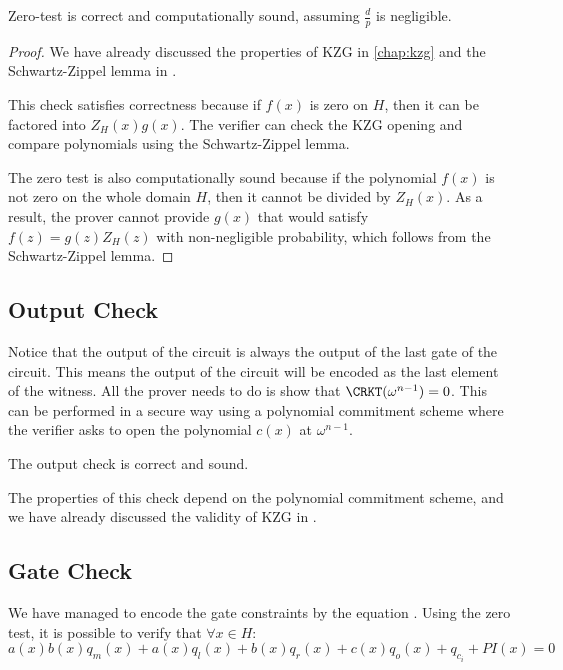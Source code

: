 \begin{theorem}
    Zero-test is correct and computationally sound, assuming $\frac{d}{p}$ is negligible.
\end{theorem}

\label{is this sufficient?}
\begin{proof}
    We have already discussed the properties of KZG in \cref{chap:kzg} and the Schwartz-Zippel lemma in . 

    This check satisfies correctness because if $f(x)$ is zero on $H$, then it can be factored into $Z_H(x)g(x)$. The verifier can check the KZG opening and compare polynomials using the Schwartz-Zippel lemma.

    The zero test is also computationally sound because if the polynomial $f(x)$ is
    not zero on the whole domain $H$, then it cannot be divided by $Z_H(x)$. As a result, the prover cannot provide $g(x)$ that would satisfy $f(z) = g(z)Z_H(z)$ with non-negligible probability, which follows from the Schwartz-Zippel lemma.
\end{proof}


\subsection{Output Check}
Notice that the output of the circuit is always the output of the last gate of the circuit. This means the output of the circuit will be encoded as the last element of the witness. All the prover needs to do is show that $\CRKT(\omega^{n-1}) = 0$. This can be performed in a secure way using a polynomial commitment scheme where the verifier asks to open the polynomial $c(x)$ at $\omega^{n-1}$.

\begin{lemma}
    \label{output-correctness-soundness}
    The output check is correct and sound.
\end{lemma}

The properties of this check depend on the polynomial commitment scheme, and we have already discussed the validity of KZG in .

\subsection{Gate Check}
We have managed to encode the gate constraints by the equation  . Using the zero test, it is possible to verify that $\forall x \in H:$
$$a(x)b(x)q_m(x) + a(x)q_l(x) + b(x)q_r(x) + c(x)q_o(x) + q_{c_i} + PI(x) = 0$$


